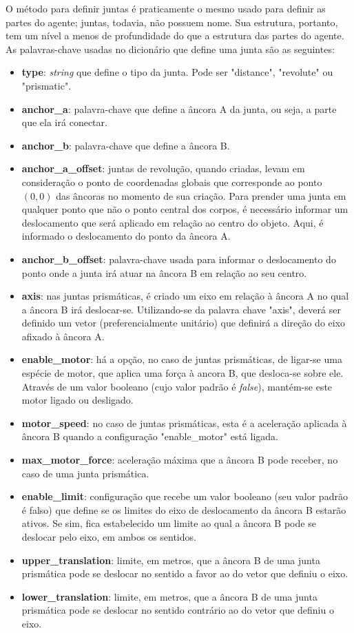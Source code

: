 \documentclass[cic,tc]{iiufrgs}
\begin{document}
O método para definir juntas é praticamente o mesmo usado para definir as partes do agente; juntas, todavia, não possuem nome. Sua estrutura, portanto, tem
um nível a menos de profundidade do que a estrutura das partes do agente. As palavras-chave usadas no dicionário que define uma junta são as seguintes:
\begin{itemize}
  \item \textbf{type}: \textit{string} que define o tipo da junta. Pode ser "distance", "revolute" ou "prismatic".
  \item \textbf{anchor\_a}: palavra-chave que define a âncora A da junta, ou seja, a parte que ela irá conectar.
  \item \textbf{anchor\_b}: palavra-chave que define a âncora B.
  \item \textbf{anchor\_a\_offset}: juntas de revolução, quando criadas, levam em consideração o ponto de coordenadas globais que corresponde ao ponto $(0,0)$
  das âncoras no momento de sua criação. Para prender uma junta em qualquer ponto que não o ponto central dos corpos, é necessário informar um deslocamento
  que será aplicado em relação ao centro do objeto. Aqui, é informado o deslocamento do ponto da âncora A.
  \item \textbf{anchor\_b\_offset}: palavra-chave usada para informar o deslocamento do ponto onde a junta irá atuar na âncora B em relação ao seu centro.
  \item \textbf{axis}: nas juntas prismáticas, é criado um eixo em relação à âncora A no qual a âncora B irá deslocar-se. Utilizando-se da palavra chave "axis",
  deverá ser definido um vetor (preferencialmente unitário) que definirá a direção do eixo afixado à âncora A.
  \item \textbf{enable\_motor}: há a opção, no caso de juntas prismáticas, de ligar-se uma espécie de motor, que aplica uma força à ancora B, que desloca-se
  sobre ele. Através de um valor booleano (cujo valor padrão é \textit{false}), mantém-se este motor ligado ou desligado.
  \item \textbf{motor\_speed}: no caso de juntas prismáticas, esta é a aceleração aplicada à âncora B quando a configuração "enable\_motor" está ligada.
  \item \textbf{max\_motor\_force}: aceleração máxima que a âncora B pode receber, no caso de uma junta prismática.
  \item \textbf{enable\_limit}: configuração que recebe um valor booleano (seu valor padrão é falso) que define se os limites do eixo de deslocamento da âncora B
  estarão ativos. Se sim, fica estabelecido um limite ao qual a âncora B pode se deslocar pelo eixo, em ambos os sentidos.
  \item \textbf{upper\_translation}: limite, em metros, que a âncora B de uma junta prismática pode se deslocar no sentido a favor ao do vetor que definiu o eixo.
  \item \textbf{lower\_translation}: limite, em metros, que a âncora B de uma junta prismática pode se deslocar no sentido contrário ao do vetor que definiu o eixo.

\end{itemize}
\end{document}
